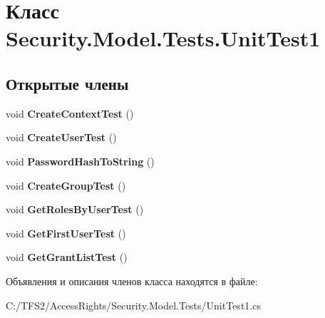 \hypertarget{class_security_1_1_model_1_1_tests_1_1_unit_test1}{}\section{Класс Security.\+Model.\+Tests.\+Unit\+Test1}
\label{class_security_1_1_model_1_1_tests_1_1_unit_test1}
\subsection*{Открытые члены}
\begin{DoxyCompactItemize}
\item 
\mbox{\label{class_security_1_1_model_1_1_tests_1_1_unit_test1_ab65ba9efe7a7e78cbc39d7434468890c}} 
void {\bfseries Create\+Context\+Test} ()
\item 
\mbox{\label{class_security_1_1_model_1_1_tests_1_1_unit_test1_ad36fec6fc90027d56e819eb5f60256ef}} 
void {\bfseries Create\+User\+Test} ()
\item 
\mbox{\label{class_security_1_1_model_1_1_tests_1_1_unit_test1_a5b73f1725c5d992ca57f4a1f3013e6a2}} 
void {\bfseries Password\+Hash\+To\+String} ()
\item 
\mbox{\label{class_security_1_1_model_1_1_tests_1_1_unit_test1_a468ee2e1674e198379ce0e123787f72e}} 
void {\bfseries Create\+Group\+Test} ()
\item 
\mbox{\label{class_security_1_1_model_1_1_tests_1_1_unit_test1_a11a43660d466daff50bca3385c4cdd6d}} 
void {\bfseries Get\+Roles\+By\+User\+Test} ()
\item 
\mbox{\label{class_security_1_1_model_1_1_tests_1_1_unit_test1_a407449a249be1904007298c1d2d23e10}} 
void {\bfseries Get\+First\+User\+Test} ()
\item 
\mbox{\label{class_security_1_1_model_1_1_tests_1_1_unit_test1_a571a70430d52c70c28fef62e0501ffb3}} 
void {\bfseries Get\+Grant\+List\+Test} ()
\end{DoxyCompactItemize}


Объявления и описания членов класса находятся в файле\+:\begin{DoxyCompactItemize}
\item 
C\+:/\+T\+F\+S2/\+Access\+Rights/\+Security.\+Model.\+Tests/Unit\+Test1.\+cs\end{DoxyCompactItemize}
